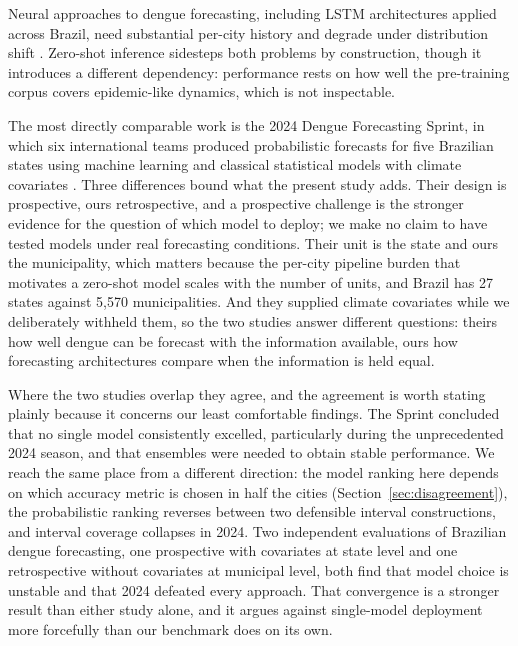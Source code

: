 \documentclass[11pt]{article}
\begin{document}
Neural approaches to dengue forecasting, including LSTM architectures applied across
Brazil, need substantial per-city history and degrade under distribution shift
\citep{Chen2025lstm}. Zero-shot inference sidesteps both problems by construction,
though it introduces a different dependency: performance rests on how well the
pre-training corpus covers epidemic-like dynamics, which is not inspectable.

The most directly comparable work is the 2024 Dengue Forecasting Sprint, in which six
international teams produced probabilistic forecasts for five Brazilian states using
machine learning and classical statistical models with climate covariates
\citep{Araujo2026sprint}. Three differences bound what the present study adds. Their
design is prospective, ours retrospective, and a prospective challenge is the stronger
evidence for the question of which model to deploy; we make no claim to have tested
models under real forecasting conditions. Their unit is the state and ours the
municipality, which matters because the per-city pipeline burden that motivates a
zero-shot model scales with the number of units, and Brazil has 27 states against 5{,}570
municipalities. And they supplied climate covariates while we deliberately withheld them,
so the two studies answer different questions: theirs how well dengue can be forecast
with the information available, ours how forecasting architectures compare when the
information is held equal.

Where the two studies overlap they agree, and the agreement is worth stating plainly
because it concerns our least comfortable findings. The Sprint concluded that no single
model consistently excelled, particularly during the unprecedented 2024 season, and that
ensembles were needed to obtain stable performance. We reach the same place from a
different direction: the model ranking here depends on which accuracy metric is chosen in
half the cities (Section~\ref{sec:disagreement}), the probabilistic ranking reverses
between two defensible interval constructions, and interval coverage collapses in 2024.
Two independent evaluations of Brazilian dengue forecasting, one prospective with
covariates at state level and one retrospective without covariates at municipal level,
both find that model choice is unstable and that 2024 defeated every approach. That
convergence is a stronger result than either study alone, and it argues against
single-model deployment more forcefully than our benchmark does on its own.
\end{document}
